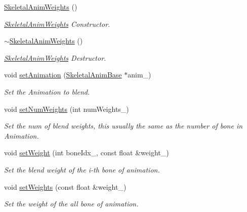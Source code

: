\begin{DoxyCompactItemize}
\item 
\hyperlink{class_i_dream_sky_1_1_skeletal_anim_weights_ad297f1b52de6b67f3547a4700cada65b}{Skeletal\+Anim\+Weights} ()
\begin{DoxyCompactList}\small\item\em \hyperlink{class_i_dream_sky_1_1_skeletal_anim_weights}{Skeletal\+Anim\+Weights} Constructor. \end{DoxyCompactList}\item 
\hyperlink{class_i_dream_sky_1_1_skeletal_anim_weights_ad1d2cf6299b9c4e9cd24b2611fc49a3b}{$\sim$\+Skeletal\+Anim\+Weights} ()
\begin{DoxyCompactList}\small\item\em \hyperlink{class_i_dream_sky_1_1_skeletal_anim_weights}{Skeletal\+Anim\+Weights} Destructor. \end{DoxyCompactList}\item 
void \hyperlink{class_i_dream_sky_1_1_skeletal_anim_weights_ac9ecdbb912592e207c38ad84c5530868}{set\+Animation} (\hyperlink{class_i_dream_sky_1_1_skeletal_anim_base}{Skeletal\+Anim\+Base} $\ast$anim\+\_\+)
\begin{DoxyCompactList}\small\item\em Set the Animation to blend. \end{DoxyCompactList}\item 
void \hyperlink{class_i_dream_sky_1_1_skeletal_anim_weights_a5e8c78f606d253b62a33e61b04784740}{set\+Num\+Weights} (int num\+Weights\+\_\+)
\begin{DoxyCompactList}\small\item\em Set the num of blend weights, this usually the same as the number of bone in Animation. \end{DoxyCompactList}\item 
void \hyperlink{class_i_dream_sky_1_1_skeletal_anim_weights_a061d2171357595d5e2920f44f972bfef}{set\+Weight} (int bone\+Idx\+\_\+, const float \&weight\+\_\+)
\begin{DoxyCompactList}\small\item\em Set the blend weight of the i-\/th bone of animation. \end{DoxyCompactList}\item 
void \hyperlink{class_i_dream_sky_1_1_skeletal_anim_weights_a5013bf4b4feafa599d3e5474448c7da8}{set\+Weights} (const float \&weight\+\_\+)
\begin{DoxyCompactList}\small\item\em Set the weight of the all bone of animation. \end{DoxyCompactList}\item 

\end{DoxyCompactItemize}
